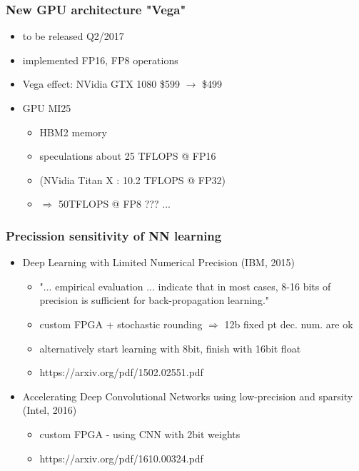 \documentclass{beamer}
\begin{document}
			\begin{frame}
				\frametitle{New GPU architecture "Vega"}
				\begin{itemize} 
					\item to be released Q2/2017
					\item implemented FP16, FP8 operations
                    \item Vega effect: NVidia GTX 1080 \$599 $\rightarrow$ \$499
					\item GPU MI25
						\begin{itemize}
                            \item HBM2 memory
							\item speculations about 25 TFLOPS @ FP16
							\item (NVidia Titan X : 10.2 TFLOPS @ FP32)
							\item $\Rightarrow$	50TFLOPS @ FP8 ??? ...
						\end{itemize} 
				\end{itemize} 
			\end{frame}
			
			\begin{frame}
				\frametitle{Precission sensitivity of NN learning}
					\begin{itemize}
						\item Deep Learning with Limited Numerical Precision (IBM, 2015)
							\begin{itemize}
								\item "... empirical evaluation ... indicate that in most cases, 8-16 bits of precision is sufficient for back-propagation learning."
								\item custom FPGA + stochastic rounding $\Rightarrow$ 12b fixed pt dec. num. are ok
								\item alternatively start learning with 8bit, finish with 16bit float
								\item https://arxiv.org/pdf/1502.02551.pdf
							\end{itemize} 
						\item Accelerating Deep Convolutional Networks using low-precision and sparsity (Intel, 2016)
							\begin{itemize}
								\item custom FPGA - using CNN with 2bit weights
								\item https://arxiv.org/pdf/1610.00324.pdf
							\end{itemize}
					\end{itemize} 
			\end{frame}
			
\end{document}
